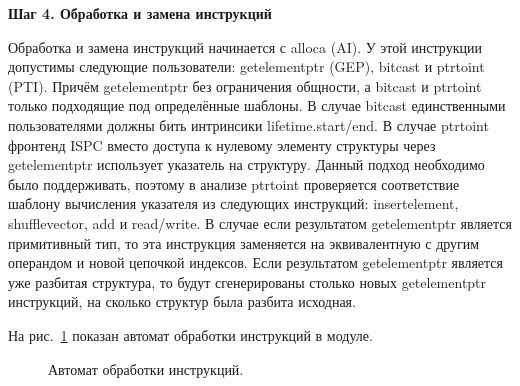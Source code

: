 \textbf{Шаг 4. Обработка и замена инструкций}

Обработка и замена инструкций начинается с alloca (AI).
У этой инструкции допустимы следующие пользователи: getelementptr (GEP), bitcast и ptrtoint (PTI).
Причём getelementptr без ограничения общности, а bitcast и ptrtoint только подходящие под определённые шаблоны.
В случае bitcast единственными пользователями должны бить интринсики lifetime.start/end.
В случае ptrtoint фронтенд ISPC вместо доступа к нулевому элементу структуры через getelementptr использует указатель на структуру.
Данный подход необходимо было поддерживать, поэтому в анализе ptrtoint проверяется соответствие шаблону вычисления указателя из следующих инструкций: insertelement, shufflevector, add и read/write.
В случае если результатом getelementptr является примитивный тип, то эта инструкция заменяется на эквивалентную с другим операндом и новой цепочкой индексов.
Если результатом getelementptr является уже разбитая структура, то будут сгенерированы столько новых getelementptr инструкций, на сколько структур была разбита исходная.

На рис.~\ref{fig:inst_proc} показан автомат обработки инструкций в модуле.

\begin{figure}[ht]
    \centering
    \caption{Автомат обработки инструкций.}
    \label{fig:inst_proc}
\end{figure}
